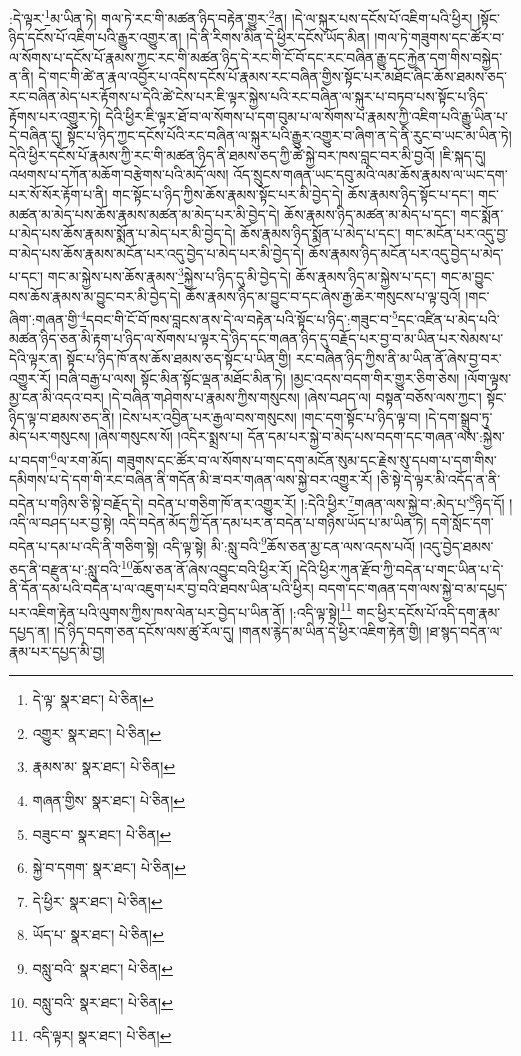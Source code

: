 :དེ་ལྟར་\footnote{དེ་ལྟ་  སྣར་ཐང་།  པེ་ཅིན། }མ་ཡིན་ཏེ། གལ་ཏེ་རང་གི་མཚན་ཉིད་བརྟེན་གྱུར་\footnote{འགྱུར་  སྣར་ཐང་།  པེ་ཅིན། }ན། །དེ་ལ་སྐུར་པས་དངོས་པོ་འཇིག་པའི་ཕྱིར། །སྟོང་ཉིད་དངོས་པོ་འཇིག་པའི་རྒྱུར་འགྱུར་ན། །དེ་ནི་རིགས་མིན་དེ་ཕྱིར་དངོས་ཡོད་མིན། །གལ་ཏེ་གཟུགས་དང་ཚོར་བ་ལ་སོགས་པ་དངོས་པོ་རྣམས་ཀྱང་རང་གི་མཚན་ཉིད་དེ་རང་གི་ངོ་བོ་དང་རང་བཞིན་རྒྱུ་དང་རྐྱེན་དག་གིས་བསྐྱེད་ན་ནི། དེ་གང་གི་ཚེ་ན་རྣལ་འབྱོར་པ་འདིས་དངོས་པོ་རྣམས་རང་བཞིན་གྱིས་སྟོང་པར་མཐོང་ཞིང་ཆོས་ཐམས་ཅད་རང་བཞིན་མེད་པར་རྟོགས་པ་དེའི་ཚེ་ངེས་པར་ཇི་ལྟར་སྐྱེས་པའི་རང་བཞིན་ལ་སྐུར་པ་བཏབ་པས་སྟོང་པ་ཉིད་རྟོགས་པར་འགྱུར་ཏེ། དེའི་ཕྱིར་ཇི་ལྟར་ཐོ་བ་ལ་སོགས་པ་དག་བུམ་པ་ལ་སོགས་པ་རྣམས་ཀྱི་འཇིག་པའི་རྒྱུ་ཡིན་པ་དེ་བཞིན་དུ། སྟོང་པ་ཉིད་ཀྱང་དངོས་པོའི་རང་བཞིན་ལ་སྐུར་པའི་རྒྱུར་འགྱུར་བ་ཞིག་ན་དེ་ནི་རུང་བ་ཡང་མ་ཡིན་ཏེ། དེའི་ཕྱིར་དངོས་པོ་རྣམས་ཀྱི་རང་གི་མཚན་ཉིད་ནི་ཐམས་ཅད་ཀྱི་ཚེ་སྐྱེ་བར་ཁས་བླང་བར་མི་བྱའོ། །ཇི་སྐད་དུ། འཕགས་པ་དཀོན་མཆོག་བརྩེགས་པའི་མདོ་ལས། འོད་སྲུངས་གཞན་ཡང་དབུ་མའི་ལམ་ཆོས་རྣམས་ལ་ཡང་དག་པར་སོ་སོར་རྟོག་པ་ནི། གང་སྟོང་པ་ཉིད་ཀྱིས་ཆོས་རྣམས་སྟོང་པར་མི་བྱེད་དེ། ཆོས་རྣམས་ཉིད་སྟོང་པ་དང་། གང་མཚན་མ་མེད་པས་ཆོས་རྣམས་མཚན་མ་མེད་པར་མི་བྱེད་དེ། ཆོས་རྣམས་ཉིད་མཚན་མ་མེད་པ་དང་། གང་སྨོན་པ་མེད་པས་ཆོས་རྣམས་སྨོན་པ་མེད་པར་མི་བྱེད་དེ། ཆོས་རྣམས་ཉིད་སྨོན་པ་མེད་པ་དང་། གང་མངོན་པར་འདུ་བྱ་བ་མེད་པས་ཆོས་རྣམས་མངོན་པར་འདུ་བྱེད་པ་མེད་པར་མི་བྱེད་དེ། ཆོས་རྣམས་ཉིད་མངོན་པར་འདུ་བྱེད་པ་མེད་པ་དང་། གང་མ་སྐྱེས་པས་ཆོས་རྣམས་\footnote{རྣམས་མ་  སྣར་ཐང་།  པེ་ཅིན། }སྐྱེས་པ་ཉིད་དུ་མི་བྱེད་དེ། ཆོས་རྣམས་ཉིད་མ་སྐྱེས་པ་དང་། གང་མ་བྱུང་བས་ཆོས་རྣམས་མ་བྱུང་བར་མི་བྱེད་དེ། ཆོས་རྣམས་ཉིད་མ་བྱུང་བ་དང་ཞེས་རྒྱ་ཆེར་གསུངས་པ་ལྟ་བུའོ། །གང་ཞིག་:གཞན་གྱི་\footnote{གཞན་གྱིས་  སྣར་ཐང་།  པེ་ཅིན། }དབང་གི་ངོ་བོ་ཁས་བླངས་ནས་དེ་ལ་བརྟེན་པའི་སྟོང་པ་ཉིད་:གཟུང་བ་\footnote{བཟུང་བ་  སྣར་ཐང་།  པེ་ཅིན། }དང་འཛིན་པ་མེད་པའི་མཚན་ཉིད་ཅན་མི་རྟག་པ་ཉིད་ལ་སོགས་པ་ལྟར་དེ་ཉིད་དང་གཞན་ཉིད་དུ་བརྗོད་པར་བྱ་བ་མ་ཡིན་པར་སེམས་པ་དེའི་ལྟར་ན། སྟོང་པ་ཉིད་ཁོ་ནས་ཆོས་ཐམས་ཅད་སྟོང་པ་ཡིན་གྱི། རང་བཞིན་ཉིད་ཀྱིས་ནི་མ་ཡིན་ནོ་ཞེས་བྱ་བར་འགྱུར་རོ། །བཞི་བརྒྱ་པ་ལས། སྟོང་མིན་སྟོང་ལྡན་མཐོང་མིན་ཏེ། །མྱང་འདས་བདག་གིར་གྱུར་ཅིག་ཅེས། །ལོག་ལྟས་མྱ་ངན་མི་འདའ་བར། །དེ་བཞིན་གཤེགས་པ་རྣམས་ཀྱིས་གསུངས། །ཞེས་བཤད་ལ། བསྟན་བཅོས་ལས་ཀྱང་། སྟོང་ཉིད་ལྟ་བ་ཐམས་ཅད་ནི། །ངེས་པར་འབྱིན་པར་རྒྱལ་བས་གསུངས། །གང་དག་སྟོང་པ་ཉིད་ལྟ་བ། །དེ་དག་སྒྲུབ་ཏུ་མེད་པར་གསུངས། །ཞེས་གསུངས་སོ། །འདིར་སྨྲས་པ། དོན་དམ་པར་སྐྱེ་བ་མེད་པས་བདག་དང་གཞན་ལས་:སྐྱེས་པ་བདག་\footnote{སྐྱེ་བ་དགག་  སྣར་ཐང་།  པེ་ཅིན། }ལ་རག་མོད། གཟུགས་དང་ཚོར་བ་ལ་སོགས་པ་གང་དག་མངོན་སུམ་དང་རྗེས་སུ་དཔག་པ་དག་གིས་དམིགས་པ་དེ་དག་གི་རང་བཞིན་ནི་གདོན་མི་ཟ་བར་གཞན་ལས་སྐྱེ་བར་འགྱུར་རོ། །ཅི་སྟེ་དེ་ལྟར་མི་འདོད་ན་ནི་བདེན་པ་གཉིས་ཅི་སྟེ་བརྗོད་དེ། བདེན་པ་གཅིག་ཁོ་ནར་འགྱུར་རོ། །:དེའི་ཕྱིར་\footnote{དེ་ཕྱིར་  སྣར་ཐང་།  པེ་ཅིན། }གཞན་ལས་སྐྱེ་བ་:མེད་པ་\footnote{ཡོད་པ་  སྣར་ཐང་།  པེ་ཅིན། }ཉིད་དོ། །འདི་ལ་བཤད་པར་བྱ་སྟེ། འདི་བདེན་མོད་ཀྱི་དོན་དམ་པར་ན་བདེན་པ་གཉིས་ཡོད་པ་མ་ཡིན་ཏེ། དགེ་སློང་དག་བདེན་པ་དམ་པ་འདི་ནི་གཅིག་སྟེ། འདི་ལྟ་སྟེ། མི་:སླུ་བའི་\footnote{བསླུ་བའི་  སྣར་ཐང་།  པེ་ཅིན། }ཆོས་ཅན་མྱ་ངན་ལས་འདས་པའོ། །འདུ་བྱེད་ཐམས་ཅད་ནི་བརྫུན་པ་:སླུ་བའི་\footnote{བསླུ་བའི་  སྣར་ཐང་།  པེ་ཅིན། }ཆོས་ཅན་ནོ་ཞེས་འབྱུང་བའི་ཕྱིར་རོ། །དེའི་ཕྱིར་ཀུན་རྫོབ་ཀྱི་བདེན་པ་གང་ཡིན་པ་དེ་ནི་དོན་དམ་པའི་བདེན་པ་ལ་འཇུག་པར་བྱ་བའི་ཐབས་ཡིན་པའི་ཕྱིར། བདག་དང་གཞན་དག་ལས་སྐྱེ་བ་མ་དཔྱད་པར་འཇིག་རྟེན་པའི་ལུགས་ཀྱིས་ཁས་ལེན་པར་བྱེད་པ་ཡིན་ནོ། །:འདི་ལྟ་སྟེ།\footnote{འདི་ལྟར།  སྣར་ཐང་།  པེ་ཅིན། } གང་ཕྱིར་དངོས་པོ་འདི་དག་རྣམ་དཔྱད་ན། །དེ་ཉིད་བདག་ཅན་དངོས་ལས་ཚུ་རོལ་དུ། །གནས་རྙེད་མ་ཡིན་དེ་ཕྱིར་འཇིག་རྟེན་གྱི། །ཐ་སྙད་བདེན་ལ་རྣམ་པར་དཔྱད་མི་བྱ། 